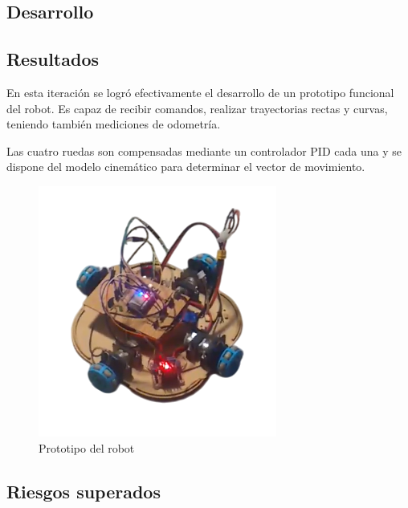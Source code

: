 \subsection{Desarrollo}













\subsection{Resultados}

En esta iteración se logró efectivamente el desarrollo de un prototipo funcional del robot. Es capaz de recibir comandos, realizar trayectorias rectas y curvas, teniendo también mediciones de odometría.

Las cuatro ruedas son compensadas mediante un controlador PID cada una y se dispone del modelo cinemático para determinar el vector de movimiento.

\begin{figure}[H]
    \centering
    \includegraphics[trim={0 1cm 0 1cm}, clip, width=0.55\linewidth]{images/robot_sin_imanes_prototipo.png}
    \caption{Prototipo del robot}
    \label{fig:primerprototiporobot}
\end{figure}

\subsection{Riesgos superados}

